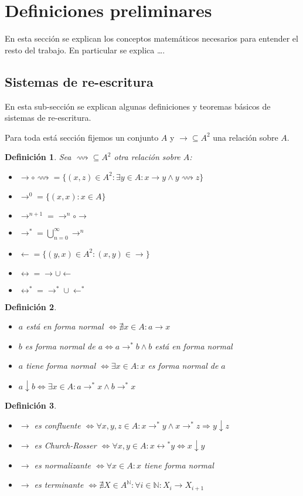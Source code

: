 \documentclass{amsbook} %
\theoremstyle{customstyle}
\newtheorem{definition}{Definición}[section]
\begin{document}
\fontsize{16pt}{19pt}\selectfont %


\section{Definiciones preliminares}

En esta sección se explican los conceptos matemáticos necesarios para entender el resto del trabajo.
En particular se explica …. %

\subsection{Sistemas de re-escritura}

En esta sub-sección se explican algunas definiciones y teoremas básicos de sistemas de re-escritura.

Para toda está sección fijemos un conjunto $A$ y $→ ⊆ A^2$ una relación sobre $A$.

\begin{definition} Sea $⟿ ⊆ A^2$ otra relación sobre $A$:
\begin{itemize}
\item $→ ∘ ⟿ = \{(x, z) ∈ A^2 : ∃y ∈ A : x → y ∧ y ⟿ z\}$
\item $→^0 = \{(x, x) : x ∈ A\}$
\item $→^{n + 1} = →^n ∘ →$
\item $→^* = ⋃_{n = 0}^∞ →^n$
\item $← = \{(y, x) ∈ A^2 : (x, y) ∈ →\}$
\item $↔ = → ∪ ←$
\item $↔^* = →^* ∪ ←^*$
\end{itemize}
\end{definition}

\begin{definition}\

\begin{itemize}
\item $a$ está en forma normal $⇔ ∄x ∈ A : a → x$
\item $b$ es forma normal de $a ⇔ a →^* b ∧ b$ está en forma normal
\item $a$ tiene forma normal $⇔ ∃x ∈ A : x$ es forma normal de $a$
\item $a ↓ b ⇔ ∃x ∈ A : a →^* x ∧ b →^* x$
\end{itemize}
\end{definition}

\begin{definition}\

\begin{itemize}
\item $→$ es confluente $⇔ ∀x, y, z ∈ A : x →^* y ∧ x →^*z ⇒ y ↓ z$
\item $→$ es Church-Rosser $⇔ ∀x, y ∈ A : x ↔️^* y ⇔ x ↓ y$
\item $→$ es normalizante $⇔ ∀x ∈ A : x$ tiene forma normal
\item $→$ es terminante $⇔ ∄X ∈ A^ℕ : ∀i ∈ ℕ : X_i → X_{i + 1}$
\end{itemize}
\end{definition}
\end{document}
